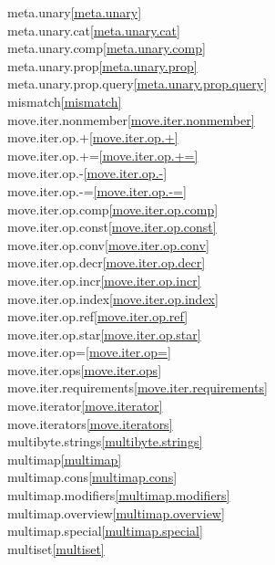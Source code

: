 \begin{multicols}{2}
meta.unary\quad\ref{meta.unary}\\
meta.unary.cat\quad\ref{meta.unary.cat}\\
meta.unary.comp\quad\ref{meta.unary.comp}\\
meta.unary.prop\quad\ref{meta.unary.prop}\\
meta.unary.prop.query\quad\ref{meta.unary.prop.query}\\
mismatch\quad\ref{mismatch}\\
move.iter.nonmember\quad\ref{move.iter.nonmember}\\
move.iter.op.+\quad\ref{move.iter.op.+}\\
move.iter.op.+=\quad\ref{move.iter.op.+=}\\
move.iter.op.-\quad\ref{move.iter.op.-}\\
move.iter.op.-=\quad\ref{move.iter.op.-=}\\
move.iter.op.comp\quad\ref{move.iter.op.comp}\\
move.iter.op.const\quad\ref{move.iter.op.const}\\
move.iter.op.conv\quad\ref{move.iter.op.conv}\\
move.iter.op.decr\quad\ref{move.iter.op.decr}\\
move.iter.op.incr\quad\ref{move.iter.op.incr}\\
move.iter.op.index\quad\ref{move.iter.op.index}\\
move.iter.op.ref\quad\ref{move.iter.op.ref}\\
move.iter.op.star\quad\ref{move.iter.op.star}\\
move.iter.op=\quad\ref{move.iter.op=}\\
move.iter.ops\quad\ref{move.iter.ops}\\
move.iter.requirements\quad\ref{move.iter.requirements}\\
move.iterator\quad\ref{move.iterator}\\
move.iterators\quad\ref{move.iterators}\\
multibyte.strings\quad\ref{multibyte.strings}\\
multimap\quad\ref{multimap}\\
multimap.cons\quad\ref{multimap.cons}\\
multimap.modifiers\quad\ref{multimap.modifiers}\\
multimap.overview\quad\ref{multimap.overview}\\
multimap.special\quad\ref{multimap.special}\\
multiset\quad\ref{multiset}\\

\end{multicols}

